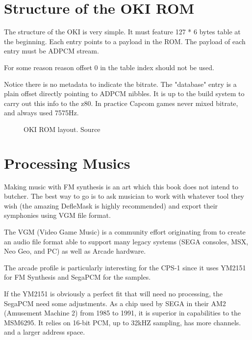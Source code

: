 \section{Structure of the OKI ROM}
The structure of the OKI is very simple. It must feature 127 * 6 bytes table at the beginning. Each entry points to a payload in the ROM. The payload of each entry must be ADPCM stream.

For some reason reason offset 0 in the table index should not be used.



Notice there is no metadata to indicate the bitrate. The "database" entry is a plain offset directly pointing to ADPCM nibbles. It is up to the build system to carry out this info to the z80. In practice Capcom games never mixed bitrate, and always used 7575Hz.

\begin{figure}[H]
\caption*{OKI ROM layout. Source }
\end{figure}















\section{Processing Musics}
Making music with FM synthesis is an art which this book does not intend to butcher. The best way to go is to ask musician to work with whatever tool they wish (the amazing DefleMask is highly recommended) and export their symphonies using VGM file format.

The VGM (Video Game Music) is a community effort originating from  to create an audio file format able to support many legacy systems (SEGA consoles, MSX, Neo Geo, and PC) as well as Arcade hardware.

The arcade profile is particularly interesting for the CPS-1 since it uses YM2151 for FM Synthesis and SegaPCM for the samples.

If the YM2151 is obviously a perfect fit that will need no processing, the SegaPCM need some adjustments. As a chip used by SEGA in their AM2 (Amusement Machine 2) from 1985 to 1991, it is superior in capabilities to the MSM6295. It relies on 16-bit PCM, up to 32kHZ sampling, has more channels. and a larger address space.

